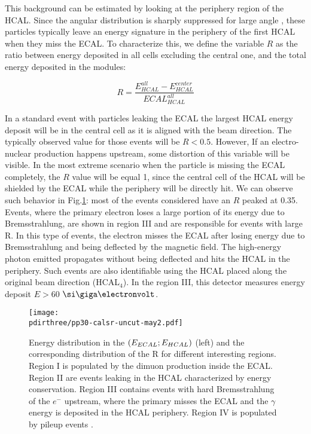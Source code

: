 This background can be estimated by looking at the periphery region of the HCAL. Since the angular distribution is sharply suppressed for large angle \cite{AUTIERO1998285,GNINENKO1998583}, these particles typically leave an energy signature in the periphery of the first HCAL when they miss the ECAL. To characterize this, we define the variable $R$ as the ratio between energy deposited in all cells excluding the central one, and the total energy deposited in the modules:

\begin{equation}
  \label{eq:R-factor}
  R = \frac{E^{all}_{HCAL} - E^{center}_{HCAL}}{ECAL^{all}_{HCAL}}
\end{equation}

In a standard event with particles leaking the ECAL the largest HCAL energy deposit will be in the central cell as it is aligned with the beam direction. The typically observed value for those events will be $R<0.5$.
However, If an electro-nuclear production happens upstream, some distortion of this variable will be visible. In the most extreme scenario when the particle is missing the ECAL completely, the $R$ value will be equal 1, since the central cell of the HCAL will be shielded by the ECAL while the periphery will be directly hit. We can observe such behavior in Fig.\ref{fig:r-value-csample}: most of the events considered have an $R$ peaked at 0.35. Events, where the primary electron loses a large portion of its energy due to Bremsstrahlung, are shown in region III and are responsible for events with large R. In this type of events, the electron misses the ECAL after losing energy due to Bremsstrahlung and being deflected by the magnetic field. The high-energy photon emitted propagates without being deflected and hits the HCAL in the periphery. Such events are also identifiable using the HCAL placed along the original beam direction (HCAL$_4$). In the region III, this detector measures energy deposit $E>60$ $\gev$.

\begin{figure}[bth!]
  \centering
  \texttt{[image: \\pdirthree/pp30-calsr-uncut-may2.pdf]}
  \caption[R value for the control sample]{Energy distribution in the $(E_{ECAL};E_{HCAL})$ (left) and the corresponding distribution of the R for different interesting regions. Region I is populated by the dimuon production inside the ECAL. Region II are events leaking in the HCAL characterized by energy conservation. Region III contains events with hard Bremsstrahlung of the $e^-$ upstream, where the primary misses the ECAL and the $\gamma$ energy is deposited in the HCAL periphery. Region IV is populated by pileup events \cite{pdegen-thesis}.}
  \label{fig:r-value-csample}
\end{figure}

